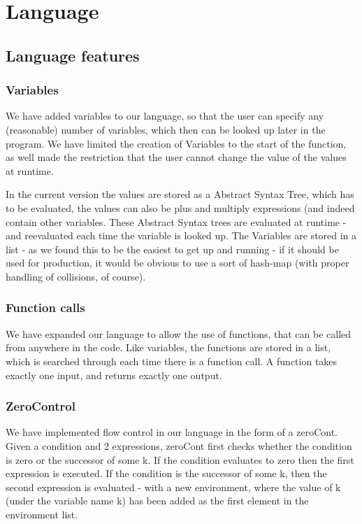 \section{Language}


\subsection{Language features}
\subsubsection{Variables}
We have added variables to our language, so that the user can specify any (reasonable) number of variables, which then can be looked up later in the program. We have limited the creation of Variables to the start of the function, as well made the restriction that the user cannot change the value of the values at runtime.

In the current version the values are stored as a Abstract Syntax Tree, which has to be evaluated, the values can also be plus and multiply expressions (and indeed contain other variables. These Abstract Syntax trees are evaluated at runtime - and reevaluated each time the variable is looked up. The Variables are stored in a list - as we found this to be the easiest to get up and running - if it should be used for production, it would be obvious to use a sort of hash-map (with proper handling of collisions, of course).

\subsubsection{Function calls}

We have expanded our language to allow the use of functions, that can be called from anywhere in the code. Like variables, the functions are stored in a list, which is searched through each time there is a function call. A function takes exactly one input, and returns exactly one output.

\subsubsection{ZeroControl}
We have implemented flow control in our language in the form of a zeroCont. Given a condition and 2 expressions, zeroCont first checks whether the condition is zero or the successor of some k. If the condition evaluates to zero then the first expression is executed. If the condition is the successor of some k, then the second expression is evaluated - with a new environment, where the value of k (under the variable name k) has been added as the first element in the environment list.

